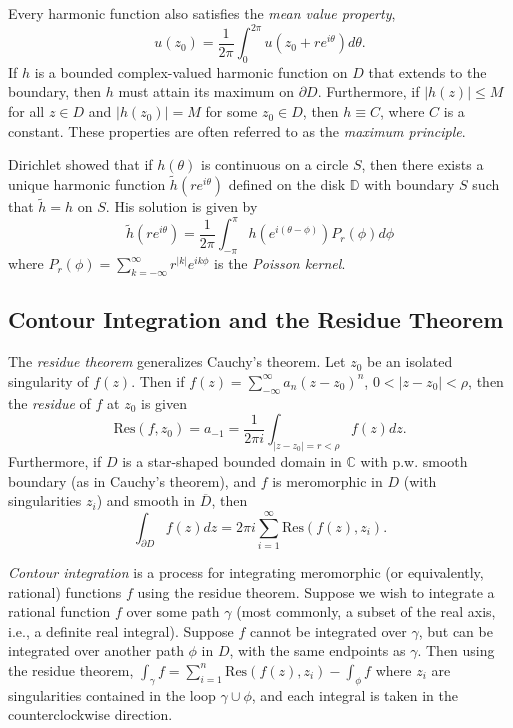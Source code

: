 \documentclass[12pt]{article}
\begin{document}
Every harmonic function also satisfies the {\it mean value property},
$$
u(z_0) = \frac{1}{2\pi}\int^{2\pi}_0 u(z_0 + re^{i\theta})d\theta.
$$
If $h$ is a bounded complex-valued harmonic function on $D$ that
extends to the boundary, then $h$ must attain its maximum on
$\partial D$. Furthermore, if $|h(z)|\leq M$ for all $z\in D$
and $|h(z_0)| = M$ for some $z_0\in D$, then $h \equiv C$, where $C$
is a constant. These properties are often referred to as the
{\it maximum principle}.

Dirichlet showed that if $h(\theta)$ is continuous on a circle $S$, then
there exists a unique harmonic function ${\tilde h}(re^{i\theta})$ defined
on the disk $\mathbb{D}$ with boundary $S$ such that ${\tilde h} = h$ on $S$.
His solution is given by
$$
{\tilde h}(re^{i\theta}) = \frac{1}{2\pi}\int_{-\pi}^\pi 
h(e^{i(\theta - \phi)})P_r(\phi)d\phi
$$
where $P_r(\phi) = \sum_{k=-\infty}^\infty r^{|k|} e^{ik\phi}$ is
the {\it Poisson kernel}.

\subsection*{Contour Integration and the Residue Theorem}

The {\it residue theorem} generalizes Cauchy's theorem.
Let $z_0$ be an isolated singularity of $f(z)$. Then if 
$f(z) = \sum_{-\infty}^\infty a_n (z-z_0)^n$, $0 < |z-z_0| <\rho$,
then the {\it residue} of $f$ at $z_0$ is given
$$
\text{Res}(f,z_0) = a_{-1} = \frac{1}{2\pi i}\int_{|z-z_0|=r<\rho} f(z) dz.
$$
Furthermore, if $D$ is a star-shaped bounded domain in $\mathbb{C}$ with
p.w. smooth boundary (as in Cauchy's theorem), and $f$ is meromorphic
in $D$ (with singularities $z_i$) and smooth in ${\overline D}$, then
$$
\int_{\partial D} f(z) dz = 2\pi i \sum_{i=1}^\infty\text{Res}(f(z),z_i).
$$

{\it Contour integration} is a process for integrating meromorphic 
(or equivalently, rational) functions $f$ using the residue theorem.
Suppose we wish to integrate a rational function $f$ over some path $\gamma$
(most commonly, a subset of the real axis, i.e., a definite real
integral). Suppose $f$ cannot be integrated over $\gamma$, but can
be integrated over another path $\phi$ in $D$, with the same endpoints
as $\gamma$. Then using the residue theorem, 
$\int_\gamma f = \sum_{i=1}^n\text{Res}(f(z),z_i)-\int_\phi f$
where $z_i$ are singularities contained in the loop $\gamma \cup \phi$,
and each integral is taken in the counterclockwise direction.
\end{document}
